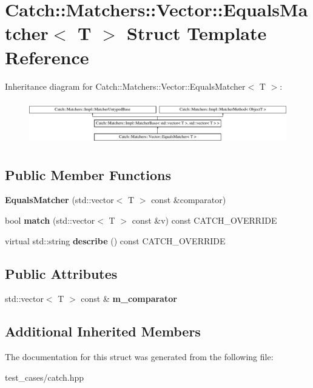 \hypertarget{structCatch_1_1Matchers_1_1Vector_1_1EqualsMatcher}{}\section{Catch\+:\+:Matchers\+:\+:Vector\+:\+:Equals\+Matcher$<$ T $>$ Struct Template Reference}
\label{structCatch_1_1Matchers_1_1Vector_1_1EqualsMatcher}
Inheritance diagram for Catch\+:\+:Matchers\+:\+:Vector\+:\+:Equals\+Matcher$<$ T $>$\+:\begin{figure}[H]
\begin{center}
\leavevmode
\includegraphics[height=1.944444cm]{structCatch_1_1Matchers_1_1Vector_1_1EqualsMatcher}
\end{center}
\end{figure}
\subsection*{Public Member Functions}
\begin{DoxyCompactItemize}
\item 
\mbox{\label{structCatch_1_1Matchers_1_1Vector_1_1EqualsMatcher_a3846c47780d1991dcfe87aefded98008}} 
{\bfseries Equals\+Matcher} (std\+::vector$<$ T $>$ const \&comparator)
\item 
\mbox{\label{structCatch_1_1Matchers_1_1Vector_1_1EqualsMatcher_aca444c319d1b4c6f538faf9c4735da04}} 
bool {\bfseries match} (std\+::vector$<$ T $>$ const \&v) const C\+A\+T\+C\+H\+\_\+\+O\+V\+E\+R\+R\+I\+DE
\item 
\mbox{\label{structCatch_1_1Matchers_1_1Vector_1_1EqualsMatcher_aca79ade26f4a75b2a57005067e086e35}} 
virtual std\+::string {\bfseries describe} () const C\+A\+T\+C\+H\+\_\+\+O\+V\+E\+R\+R\+I\+DE
\end{DoxyCompactItemize}
\subsection*{Public Attributes}
\begin{DoxyCompactItemize}
\item 
\mbox{\label{structCatch_1_1Matchers_1_1Vector_1_1EqualsMatcher_a56f7aa6f110a12b1b9aeb0cabbc9d755}} 
std\+::vector$<$ T $>$ const  \& {\bfseries m\+\_\+comparator}
\end{DoxyCompactItemize}
\subsection*{Additional Inherited Members}


The documentation for this struct was generated from the following file\+:\begin{DoxyCompactItemize}
\item 
test\+\_\+cases/catch.\+hpp\end{DoxyCompactItemize}
